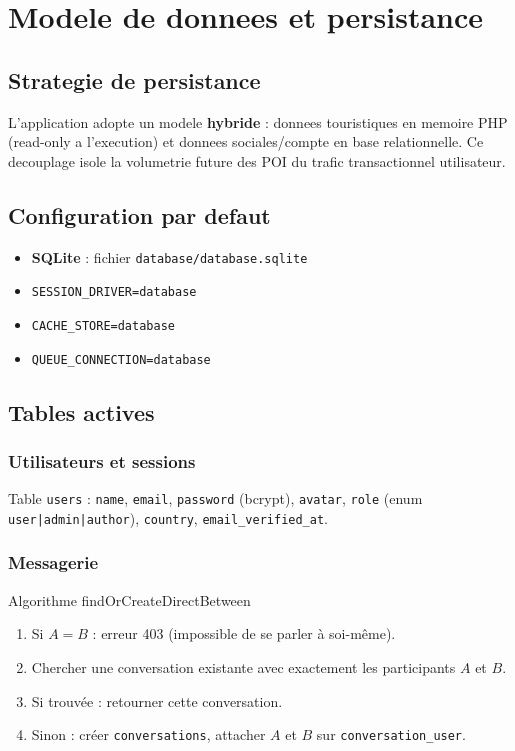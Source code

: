 \chapter{Modele de donnees et persistance}
\label{ch:data}

\section{Strategie de persistance}

L'application adopte un modele \textbf{hybride} : donnees touristiques en memoire PHP (read-only a l'execution) et donnees sociales/compte en base relationnelle. Ce decouplage isole la volumetrie future des POI du trafic transactionnel utilisateur.

\erdDiagram

\section{Configuration par defaut}

\begin{itemize}
  \item \textbf{SQLite} : fichier \texttt{database/database.sqlite}
  \item \texttt{SESSION\_DRIVER=database}
  \item \texttt{CACHE\_STORE=database}
  \item \texttt{QUEUE\_CONNECTION=database}
\end{itemize}

\section{Tables actives}

\subsection{Utilisateurs et sessions}

Table \texttt{users} : \texttt{name}, \texttt{email}, \texttt{password} (bcrypt), \texttt{avatar}, \texttt{role} (enum \texttt{user|admin|author}), \texttt{country}, \texttt{email\_verified\_at}.

\subsection{Messagerie}

\begin{infobox}{Algorithme findOrCreateDirectBetween}
\begin{enumerate}
  \item Si $A = B$ : erreur 403 (impossible de se parler \`a soi-m\^eme).
  \item Chercher une conversation existante avec exactement les participants $A$ et $B$.
  \item Si trouv\'ee : retourner cette conversation.
  \item Sinon : cr\'eer \texttt{conversations}, attacher $A$ et $B$ sur \texttt{conversation\_user}.
\end{enumerate}
\end{infobox}

